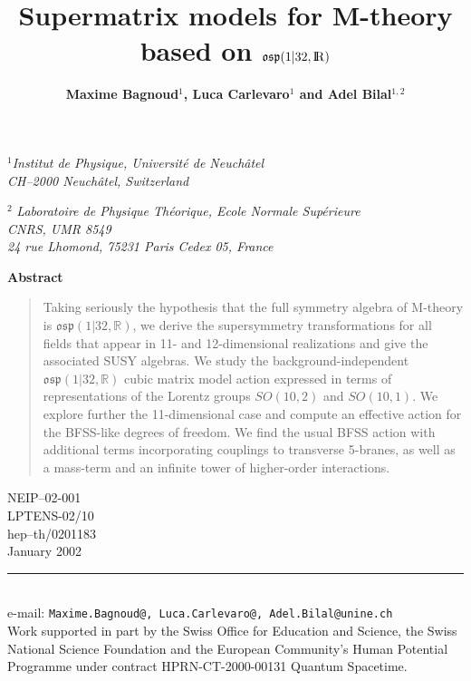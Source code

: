 \documentclass[a4paper,11pt]{article}
\def\R{{\rm I\kern-.2em R}}
\begin{document}
\title{\huge\bf  Supermatrix models for {\cal M}-theory \\based on $\mathfrak{osp}(1|32,\R)$}

\author{\bf Maxime Bagnoud$^1$, Luca Carlevaro$^1$ and Adel Bilal$^{1,2}$}
\date{}
\maketitle
\begin{center}
$^1${\it Institut de Physique, Universit\'e de Neuch\^atel \\
CH--2000 Neuch\^atel, Switzerland}


$^2$ {\it Laboratoire de Physique Th\'eorique, Ecole Normale Sup\'erieure\\
CNRS, UMR 8549 \\
24 rue Lhomond, 75231 Paris Cedex 05, France}

\end{center}

\vspace{1cm}

\begin{center}
{\bf Abstract}
\end{center}
\begin{quote}
Taking seriously the hypothesis that the full symmetry algebra of M-theory is $\mathfrak{osp}(1|32,\mathbb{R})$,
we derive the supersymmetry transformations for all fields that appear in 11- and 
12-dimensional realizations and give the associated {\cal SUSY} algebras. 
We study the background-independent $\mathfrak{osp}(1|32,\mathbb{R})$ cubic matrix model 
action expressed in terms of representations of the Lorentz groups $SO(10,2)$ and $SO(10,1)$.
We explore further the 11-dimensional case and compute an effective action for the BFSS-like degrees of freedom. 
We find the usual BFSS action with additional terms incorporating couplings to transverse 5-branes, 
as well as a mass-term and an infinite tower of higher-order interactions.
\end{quote}

\vspace{-170mm}
\begin{flushright}
NEIP--02-001 \\
LPTENS-02/10 \\
hep--th/0201183 \\
January 2002
\end{flushright}
\vspace{2.4cm}
\vfill
\begin{flushleft}
\rule{8.1cm}{0.2mm}\\

{\small e-mail: \tt Maxime.Bagnoud@, Luca.Carlevaro@, Adel.Bilal@unine.ch}\\
{\small Work supported in part by the Swiss Office for Education and Science,
the Swiss National Science Foundation and the European Community's Human 
Potential Programme under contract HPRN-CT-2000-00131 Quantum Spacetime.}\\
\end{flushleft}
\end{document}
